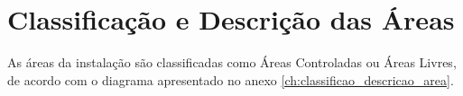 \chapter{Classificação e Descrição das Áreas}
As áreas da instalação são classificadas como Áreas Controladas ou Áreas Livres,
de acordo com o diagrama apresentado no anexo \ref{ch:classificao_descricao_area}.